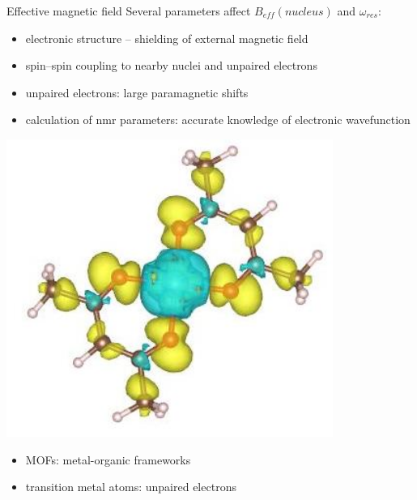 \documentclass[slovene, usenames,dvipsnames]{beamer}
\begin{document}
\begin{frame}{Effective magnetic field}
  Several parameters affect $B_{eff}(nucleus)$ and $\omega_{res}$: \pause
  \begin{itemize}
  \item electronic structure -- shielding of external magnetic field \pause 
  \item spin--spin coupling to nearby nuclei and unpaired electrons \pause
  \item unpaired electrons: large paramagnetic shifts \pause
    \item calculation of nmr parameters: accurate knowledge of electronic wavefunction
   \end{itemize}
 \begin{minipage}[]{0.4\textwidth}
      \centering
    \includegraphics[width=0.8\textwidth]{cuacac_spin_density.png}
 \end{minipage}%
 \begin{minipage}[]{0.6\textwidth}
   \centering
    \begin{itemize}
    \item MOFs: metal-organic frameworks \pause
    \item transition metal atoms: unpaired electrons \pause
   \end{itemize}
 \end{minipage}
\end{frame}
\end{document}
